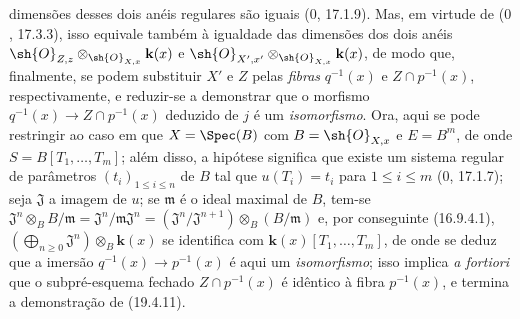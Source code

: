 
dimensões desses dois anéis regulares são iguais ($0$, 17.1.9). Mas, em virtude de ($0$, 17.3.3), isso equivale também à igualdade das dimensões dos dois anéis $\sh{O}_{Z,z}\otimes_{\sh{O}_{X,x}}\mathbf k(x)$ e $\sh{O}_{X',x'}\otimes_{\sh{O}_{X,x}}\mathbf k(x)$, de modo que, finalmente, se podem substituir $X'$ e $Z$ pelas \emph{fibras} $q^{-1}(x)$ e $Z\cap p^{-1}(x)$, respectivamente, e reduzir-se a demonstrar que o morfismo $q^{-1}(x)\to Z\cap p^{-1}(x)$ deduzido de $j$ é um \emph{isomorfismo}. Ora, aqui se pode restringir ao caso em que $X=\Spec(B)$ com $B=\sh{O}_{X,x}$ e $E=B^m$, de onde $S=B[T_1,\ldots,T_m]$; além disso, a hipótese significa que existe um sistema regular de parâmetros $(t_i)_{1\leq i\leq n}$ de $B$ tal que $u(T_i)=t_i$ para $1\leq i\leq m$ ($0$, 17.1.7); seja $\mathfrak J$ a imagem de $u$; se $\mathfrak m$ é o ideal maximal de $B$, tem-se $\mathfrak J^n\otimes_B B/\mathfrak m=\mathfrak J^n/\mathfrak m\mathfrak J^n=(\mathfrak J^n/\mathfrak J^{n+1})\otimes_B(B/\mathfrak m)$ e, por conseguinte (16.9.4.1), $(\bigoplus_{n\geq0}\mathfrak J^n)\otimes_B\mathbf k(x)$ se identifica com $\mathbf k(x)[T_1,\ldots,T_m]$, de onde se deduz que a imersão $q^{-1}(x)\to p^{-1}(x)$ é aqui um \emph{isomorfismo}; isso implica \emph{a fortiori} que o subpré-esquema fechado $Z\cap p^{-1}(x)$ é idêntico à fibra $p^{-1}(x)$, e termina a demonstração de (19.4.11).
